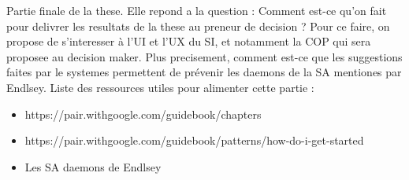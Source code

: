 Partie finale de la these.
Elle repond a la question : Comment est-ce qu'on fait pour delivrer les resultats de la these au preneur de decision ?
Pour ce faire, on propose de s'interesser à l'UI et l'UX du SI, et notamment la COP qui sera proposee au decision maker.
Plus precisement, comment est-ce que les suggestions faites par le systemes permettent de prévenir les daemons de la SA mentiones par Endlsey.
Liste des ressources utiles pour alimenter cette partie :
\begin{itemize}
    \item https://pair.withgoogle.com/guidebook/chapters
    \item https://pair.withgoogle.com/guidebook/patterns/how-do-i-get-started
    \item Les SA daemons de Endlsey
\end{itemize}



